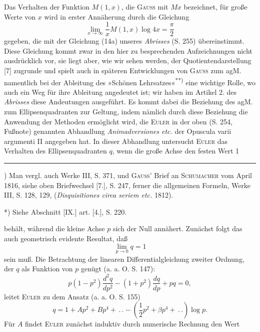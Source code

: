 \par\indent Das Verhalten der Funktion $M(1,x)$, die \textsc{Gauss} mit $Mx$ bezeichnet, für große Werte von $x$ wird in erster Annäherung durch die Gleichung
\begin{equation*}\tag*{$(\alpha)$}\lim_{x\to\infty}\frac1xM(1,x)\log4x=\frac\pi2\end{equation*}
\noindent gegeben, die mit der Gleichung (14a) unseres \textit{Abrisses} (S. 255) übereinstimmt. Diese Gleichung kommt zwar in den hier zu besprechenden Aufzeichnungen nicht ausdrücklich vor, sie liegt aber, wie wir sehen werden, der Quotientendarstellung [7] zugrunde und spielt auch in späteren Entwicklungen von \textsc{Gauss} zum agM. namentlich bei der Ableitung des »Schönen Lehrsatzes«\textsuperscript{**)} eine wichtige Rolle, wo auch ein Weg für ihre Ableitung angedeutet ist; wir haben im Artikel 2. des \textit{Abrisses} diese Andeutungen ausgeführt. Es kommt dabei die Beziehung des agM. zum Ellipsenquadranten zur Geltung, indem nämlich durch diese Beziehung die Anwendung der Methoden ermöglicht wird, die \textsc{Euler} in der oben (S. 254, Fußnote) genannten Abhandlung \textit{Animadversiones etc.} der Opuscula varii argumenti II angegeben hat. In dieser Abhandlung untersucht \textsc{Euler} das Verhalten des Ellipsenquadranten $q$, wenn die große Achse den festen Wert 1
\par\smallskip\noindent\rule{.25\linewidth}{.4pt}\par
{\small
\par\indent *) Man vergl. auch Werke III, S. 371, und \textsc{Gauss}' Brief an \textsc{Schumacher} vom April 1816, siehe oben Briefwechsel [7.], S. 247, ferner die allgemeinen Formeln, Werke III, S. 128, 129, (\textit{Disquisitiones circa seriem etc.} 1812).
\par\indent **) Siehe Abschnitt [IX.] art. [4.], S. 220.
\par}
\clearpage
\fancyhead{}
\noindent behält, während die kleine Achse $p$ sich der Null annähert. Zunächst folgt das auch geometrisch evidente Resultat, daß
\[\lim_{p\to0}q=1\]
\noindent sein muß. Die Betrachtung der linearen Differentialgleichung zweiter Ordnung, der $q$ als Funktion von $p$ genügt (a. a. O. S. 147):
\[p(1-p^2)\frac{d^2q}{dp^2}-(1+p^2)\frac{dq}{dp}+pq=0,\]
\noindent leitet \textsc{Euler} zu dem Ansatz (a. a. O. S. 155)
\[q=1+Ap^2+Bp^4+\,.\,.-\left(\frac12p^2+\beta p^4+\,.\,.\right)\log p.\]
\noindent Für $A$ findet \textsc{Euler} zunächst induktiv durch numerische Rechnung den Wert
